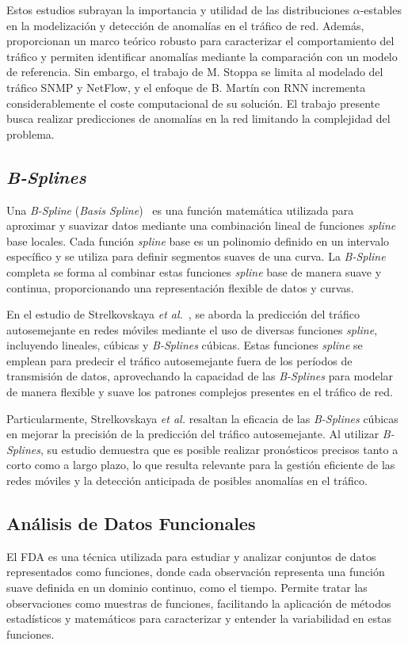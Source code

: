 Estos estudios subrayan la importancia y utilidad de las distribuciones $\alpha$-estables en la modelización y detección de anomalías en el tráfico de red. Además, proporcionan un marco teórico robusto para caracterizar el comportamiento del tráfico y permiten identificar anomalías mediante la comparación con un modelo de referencia. Sin embargo, el trabajo de M. Stoppa se limita al modelado del tráfico SNMP y NetFlow, y el enfoque de B. Martín con \ac{RNN} incrementa considerablemente el coste computacional de su solución. El trabajo presente busca realizar predicciones de anomalías en la red limitando la complejidad del problema.

\subsection{\textit{B-Splines}} %
Una \textit{B-Spline} (\textit{Basis Spline})~\cite{prautzsch2002bezier} es una función matemática utilizada para aproximar y suavizar datos mediante una combinación lineal de funciones \textit{spline} base locales. Cada función \textit{spline} base es un polinomio definido en un intervalo específico y se utiliza para definir segmentos suaves de una curva. La \textit{B-Spline} completa se forma al combinar estas funciones \textit{spline} base de manera suave y continua, proporcionando una representación flexible de datos y curvas.

En el estudio de Strelkovskaya \textit{et al.}~\cite{strelkovskaya2019}, se aborda la predicción del tráfico autosemejante en redes móviles mediante el uso de diversas funciones \textit{spline}, incluyendo lineales, cúbicas y \textit{B-Splines} cúbicas. Estas funciones \textit{spline} se emplean para predecir el tráfico autosemejante fuera de los períodos de transmisión de datos, aprovechando la capacidad de las \textit{B-Splines} para modelar de manera flexible y suave los patrones complejos presentes en el tráfico de red.

Particularmente, Strelkovskaya \textit{et al.} resaltan la eficacia de las \textit{B-Splines} cúbicas en mejorar la precisión de la predicción del tráfico autosemejante. Al utilizar \textit{B-Splines}, su estudio demuestra que es posible realizar pronósticos precisos tanto a corto como a largo plazo, lo que resulta relevante para la gestión eficiente de las redes móviles y la detección anticipada de posibles anomalías en el tráfico.

\subsection{An\'alisis de Datos Funcionales} %
El \ac{FDA} es una técnica utilizada para estudiar y analizar conjuntos de datos representados como funciones, donde cada observación representa una función suave definida en un dominio continuo, como el tiempo. Permite tratar las observaciones como muestras de funciones, facilitando la aplicación de métodos estadísticos y matemáticos para caracterizar y entender la variabilidad en estas funciones.


